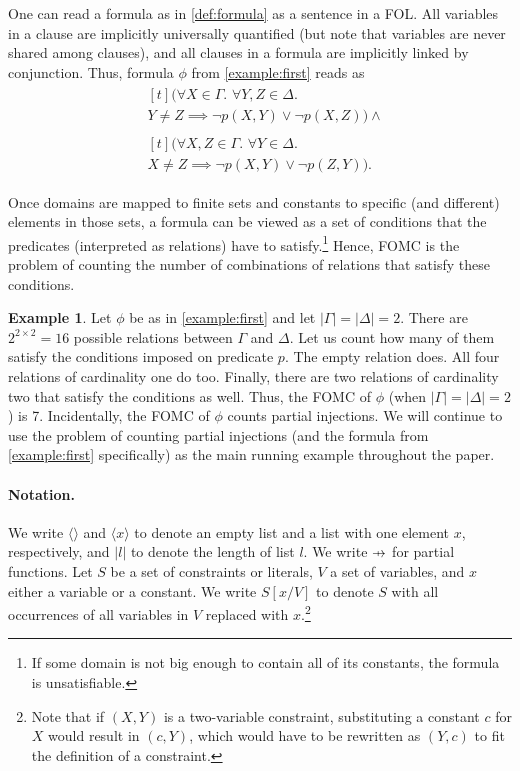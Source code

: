 \documentclass[letterpaper]{article} %
\newcommand\pfun{\mathrel{\ooalign{\hfil$\mapstochar\mkern5mu$\hfil\cr$\to$\cr}}}
\theoremstyle{definition}
\newtheorem{example}{Example}
\begin{document}
One can read a formula as in \cref{def:formula} as a sentence in a FOL\@. All
variables in a clause are implicitly universally quantified (but note that
variables are never shared among clauses), and all clauses in a formula are
implicitly linked by conjunction. Thus, formula $\phi$ from \cref{example:first}
reads as
\begin{align*}
  &\begin{multlined}[t]
    (\forall X \in \Gamma\text{. }\forall Y, Z \in \Delta\text{. }\\
    Y \ne Z \implies \neg p(X, Y) \lor \neg p(X, Z)) \land
    \end{multlined}\\
  &\begin{multlined}[t]
    (\forall X, Z \in \Gamma\text{. }\forall Y \in \Delta\text{. }\\
    X \ne Z \implies \neg p(X, Y) \lor \neg p(Z, Y)).
    \end{multlined}
\end{align*}

Once domains are mapped to finite sets and constants to specific (and different)
elements in those sets, a formula can be viewed as a set of conditions that the
predicates (interpreted as relations) have to satisfy.\footnote{If some domain
  is not big enough to contain all of its constants, the formula is
  unsatisfiable.} Hence, FOMC is the problem of counting the number of
combinations of relations that satisfy these conditions.

\begin{example}
  Let $\phi$ be as in \cref{example:first} and let $|\Gamma| = |\Delta| = 2$.
  There are $2^{2 \times 2} = 16$ possible relations between $\Gamma$ and
  $\Delta$. Let us count how many of them satisfy the conditions imposed on
  predicate $p$. The empty relation does. All four relations of cardinality one
  do too. Finally, there are two relations of cardinality two that satisfy the
  conditions as well. Thus, the FOMC of $\phi$ (when $|\Gamma| = |\Delta| = 2$)
  is 7. Incidentally, the FOMC of $\phi$ counts partial injections. We will
  continue to use the problem of counting partial injections (and the formula
  from \cref{example:first} specifically) as the main running example throughout
  the paper.
\end{example}

\paragraph*{Notation.}
We write $\langle\rangle$ and $\langle x \rangle$ to denote an empty list and a
list with one element $x$, respectively, and $|l|$ to denote the length of list
$l$. We write $\pfun$ for partial functions. Let $S$ be a set of constraints or
literals, $V$ a set of variables, and $x$ either a variable or a constant. We
write $S[x/V]$ to denote $S$ with all occurrences of all variables in $V$
replaced with $x$.\footnote{Note that if $(X, Y)$ is a two-variable constraint,
  substituting a constant $c$ for $X$ would result in $(c, Y)$, which would have
  to be rewritten as $(Y, c)$ to fit the definition of a constraint.}
\end{document}
